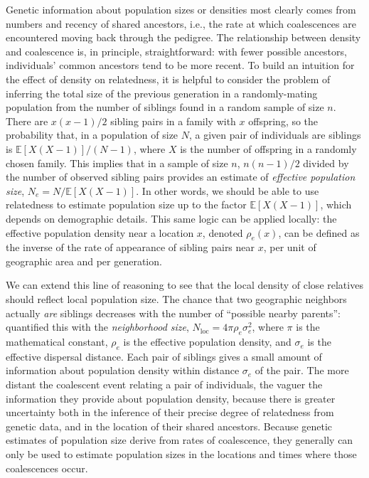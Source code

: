 \documentclass{ar-1col}
\newcommand{\g}[1]{{\color{blue}{#1}}}
\renewcommand{\emph}[1]{{\textit{#1}}}
\newcommand{\E}{\mathbb{E}}
\begin{document}
Genetic information about population sizes or densities most clearly
comes from numbers and recency of shared ancestors, 
i.e., the rate at which coalescences are encountered moving back through the pedigree.
The relationship between density and coalescence is, in principle, straightforward:
with fewer possible ancestors,
individuals' common ancestors tend to be more recent.
To build an intuition for the effect of density on relatedness,
it is helpful to consider 
the problem of inferring the total size of the previous generation
in a randomly-mating population
from the number of siblings found in a random sample of size $n$.
There are $x (x-1) / 2$ sibling pairs in a family with $x$ offspring,
so the probability that, 
in a population of size $N$, 
a given pair of individuals are siblings
is $\E[X (X-1)] / (N-1)$, where $X$ is the number of offspring in a randomly chosen family.
This implies that in a sample of size $n$,
$n(n-1)/2$ divided by the number of observed sibling pairs 
provides an estimate of \g{(inbreeding)} \emph{effective population size}, 
$N_e = N/\E[X(X-1)]$.
In other words, we should be able to use relatedness to estimate population size
up to the factor $\E[X(X-1)]$, which depends on demographic details. 
This same logic can be applied locally:
the \g{(inbreeding)} effective population density
near a location $x$, denoted $\rho_e(x)$,
can be defined as the inverse of the rate of appearance of sibling pairs
near $x$, per unit of geographic area and per generation.

We can extend this line of reasoning to see that 
the local density of close relatives
should reflect local population size.
The chance that two geographic neighbors actually \emph{are} siblings 
decreases with the number of ``possible nearby parents'':
\citet{wright1946isolation} quantified this with the
\emph{neighborhood size}, 
$N_\text{loc} = 4 \pi \rho_e \sigma_e^2$,
where $\pi$ is the mathematical constant,
$\rho_e$ is the effective population density,
and $\sigma_e$ is the effective dispersal distance.
Each pair of siblings gives a small amount of information
about population density within distance $\sigma_e$ of the pair.
The more distant the coalescent event relating a pair of individuals, 
the vaguer the information they provide about population density,
because there is greater uncertainty 
both in the inference of their precise degree of relatedness from genetic data,
and in the location of their shared ancestors.
Because genetic estimates of population size 
derive from rates of coalescence,
they generally can only be used to estimate population sizes 
in the locations and times where those coalescences occur.
\end{document}
